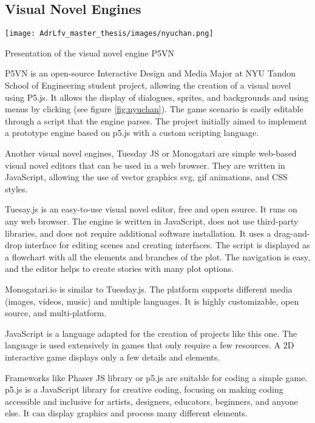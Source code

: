 \subsection{Visual Novel Engines}

\begin{marginfigure}
    \centering
    \texttt{[image: AdrLfv\_master\_thesis/images/nyuchan.png]}
    \caption{Presentation of the visual novel engine P5VN}
    \label{fig:nyuchan}
\end{marginfigure}

P5VN is an open-source Interactive Design and Media Major at NYU Tandon School of Engineering student project, allowing the creation of a visual novel using P5.js. It allows the display of dialogues, sprites, and backgrounds and using menus by clicking (see figure \ref{fig:nyuchan}). The game scenario is easily editable through a script that the engine parses. The project initially aimed to implement a prototype engine based on p5.js with a custom scripting language.  

Another visual novel engines, Tuesday JS \cite{TuesdayJS} or Monogatari \cite{monogatari} are simple web-based visual novel editors that can be used in a web browser. They are written in JavaScript, allowing the use of vector graphics svg, gif animations, and CSS styles.

Tuesay.js is an easy-to-use visual novel editor, free and open source. It runs on any web browser. The engine is written in JavaScript, does not use third-party libraries, and does not require additional software installation. It uses a drag-and-drop interface for editing scenes and creating interfaces. The script is displayed as a flowchart with all the elements and branches of the plot. The navigation is easy, and the editor helps to create stories with many plot options.

Monogatari.io is similar to Tuesday.js. The platform supports different media (images, videos, music) and multiple languages. It is highly customizable, open source, and multi-platform. 

JavaScript is a language adapted for the creation of projects like this one. 
The language is used extensively in games that only require a few resources. A 2D interactive game displays only a few details and elements.

Frameworks like Phaser JS library or p5.js are suitable for coding a simple game. p5.js is a JavaScript library for creative coding, focusing on making coding accessible and inclusive for artists, designers, educators, beginners, and anyone else. It can display graphics and process many different elements.

